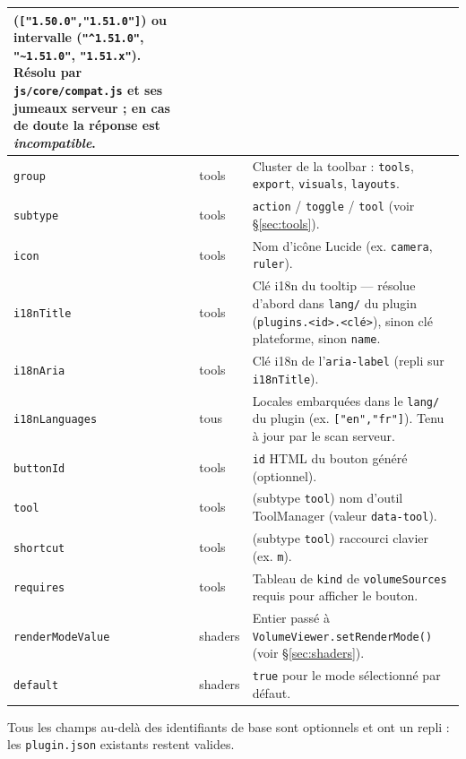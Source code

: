 \documentclass[11pt,a4paper]{article}
\newcommand{\code}[1]{\texttt{#1}}
\newcommand{\filepath}[1]{\texttt{\small #1}}
\begin{document}
\begin{center}
\begin{tabularx}{\linewidth}{@{}l l X@{}}
                              (\code{["1.50.0","1.51.0"]}) ou intervalle
                              (\code{"\textasciicircum{}1.51.0"}, \code{"\textasciitilde{}1.51.0"},
                              \code{"1.51.x"}). Résolu par \filepath{js/core/compat.js} et ses
                              jumeaux serveur ; en cas de doute la réponse est
                              \emph{incompatible}. \\
\midrule
\code{group}         & tools & Cluster de la toolbar : \code{tools}, \code{export}, \code{visuals}, \code{layouts}. \\
\code{subtype}       & tools & \code{action} / \code{toggle} / \code{tool} (voir §\ref{sec:tools}). \\
\code{icon}          & tools & Nom d'icône Lucide (ex. \code{camera}, \code{ruler}). \\
\code{i18nTitle}     & tools & Clé i18n du tooltip --- résolue d'abord dans \filepath{lang/} du plugin (\code{plugins.<id>.<clé>}), sinon clé plateforme, sinon \code{name}. \\
\code{i18nAria}      & tools & Clé i18n de l'\code{aria-label} (repli sur \code{i18nTitle}). \\
\code{i18nLanguages} & tous & Locales embarquées dans le \filepath{lang/} du plugin (ex. \code{["en","fr"]}). Tenu à jour par le scan serveur. \\
\code{buttonId}      & tools & \code{id} HTML du bouton généré (optionnel). \\
\code{tool}          & tools & (subtype \code{tool}) nom d'outil ToolManager (valeur \code{data-tool}). \\
\code{shortcut}      & tools & (subtype \code{tool}) raccourci clavier (ex. \code{m}). \\
\code{requires}      & tools & Tableau de \code{kind} de \code{volumeSources} requis pour afficher le bouton. \\
\midrule
\code{renderModeValue} & shaders & Entier passé à \code{VolumeViewer.setRenderMode()} (voir §\ref{sec:shaders}). \\
\code{default}         & shaders & \code{true} pour le mode sélectionné par défaut. \\
\bottomrule
\end{tabularx}
\end{center}

\noindent Tous les champs au-delà des identifiants de base sont optionnels et ont
un repli : les \filepath{plugin.json} existants restent valides.
\end{document}
